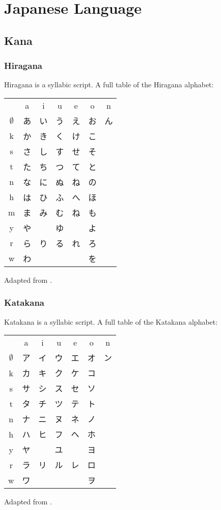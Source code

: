 

\chapter{Japanese Language}
\label{chap:japaneselanguage}

\section{Kana }
\label{sec:kana}

\subsection{Hiragana }
\label{sec:hiragana}

Hiragana is a syllabic script. A full table of the Hiragana alphabet:

\begin{CJK}
  \begin{tabular}{c c c c c c c}
 &a&i&u&e&o&n\\
$\emptyset$&あ&い&う&え&お&ん\\
k&か&き&く&け&こ&\\
s&さ&し&す&せ&そ&\\
t&た&ち&つ&て&と&\\
n&な&に&ぬ&ね&の&\\
h&は&ひ&ふ&へ&ほ&\\
m&ま&み&む&ね&も&\\
y&や& &ゆ& &よ&\\
r&ら&り&る&れ&ろ&\\
w&わ& & & &を&\\
  \end{tabular}
\end{CJK}
Adapted from .

\subsection{Katakana }
\label{sec:katakana}

Katakana is a syllabic script. A full table of the Katakana alphabet:
\begin{CJK}
  \begin{tabular}{c c c c c c c}
 &a&i&u&e&o&n\\
$\emptyset$&ア&イ&ウ&エ&オ&ン\\
k&カ&キ&ク&ケ&コ&\\
s&サ&シ&ス&セ&ソ&\\
t&タ&チ&ツ&テ&ト&\\
n&ナ&ニ&ヌ&ネ&ノ&\\
h&ハ&ヒ&フ&ヘ&ホ&\\
y&ヤ&　&ユ&　&ヨ&\\
r&ラ&リ&ル&レ&ロ&\\
w&ワ&　&　&　&ヲ&\\
  \end{tabular}
\end{CJK}
Adapted from .
